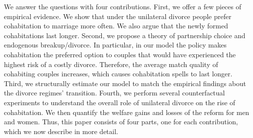 \documentclass[12pt]{article}
\numberwithin{table}{section}
\begin{document}
We answer the questions with four contributions. First, we offer a few pieces of empirical evidence. We show that under the unilateral divorce people prefer cohabitation to marriage more often. We also argue that the newly formed cohabitations last longer. Second, we propose a theory of partnership choice and endogenous breakup/divorce. In particular, in our model the policy makes cohabitation the preferred option to couples that would have experienced the highest risk of a costly divorce. Therefore, the average match quality of cohabiting couples increases, which causes cohabitation spells to last longer. %
Third, we structurally estimate our model to match the empirical findings about the divorce regimes' transition. Fourth, we perform several counterfactual experiments to understand the overall role of unilateral divorce on the rise of cohabitation. We then quantify the welfare gains and losses of the reform for men and women. Thus, this paper consists of four parts, one for each contribution, which we now describe in more detail.

\end{document}
